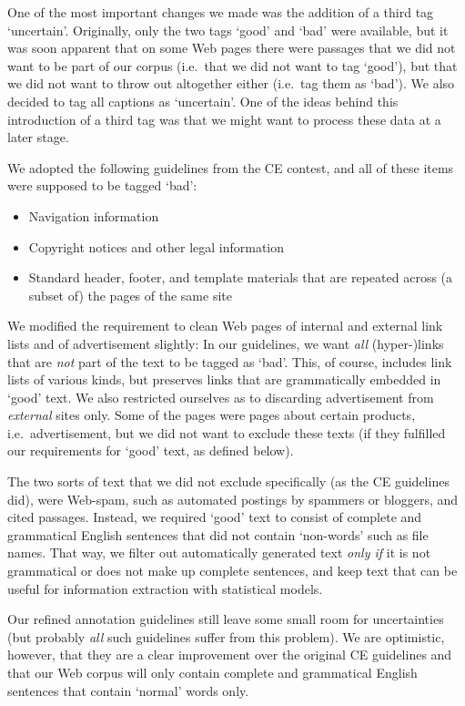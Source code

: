\documentclass[12pt,a4paper]{article}
\begin{document}
One of the most important changes we made was the addition of a third tag `uncertain'. 
Originally, only the two tags `good' and `bad' were available, but it was soon apparent that on some Web pages there were passages that we did not want to be part of our corpus (i.e.~that we did not want to tag `good'), but that we did not want to throw out altogether either (i.e.~tag them as `bad'). 
We also decided to tag all captions as `uncertain'. 
One of the ideas behind this introduction of a third tag was that we might want to process these data at a later stage.

We adopted the following guidelines from the CE contest, and all of these items were supposed to be tagged `bad':

\begin{itemize}
	\item Navigation information
	\item Copyright notices and other legal information
	\item Standard header, footer, and template materials that are repeated across (a subset of) the pages of the same site
\end{itemize}

We modified the requirement to clean Web pages of internal and external link lists and of advertisement slightly: 
In our guidelines, we want \textit{all} \mbox{(hyper-)links} that are \textit{not} part of the text to be tagged as `bad'. 
This, of course, includes link lists of various kinds, but preserves links that are grammatically embedded in `good' text. 
We also restricted ourselves as to discarding advertisement from \textit{external} sites only. 
Some of the pages were pages about certain products, i.e.~advertisement, but we did not want to exclude these texts (if they fulfilled our requirements for `good' text, as defined below).

The two sorts of text that we did not exclude specifically (as the CE guidelines did), were Web-spam, such as automated postings by spammers or bloggers, and cited passages. 
Instead, we required `good' text to consist of complete and grammatical English sentences that did not contain `non-words' such as file names. 
That way, we filter out automatically generated text \textit{only if} it is not grammatical or does not make up complete sentences, and keep text that can be useful for information extraction with statistical models.

Our refined annotation guidelines still leave some small room for uncertainties (but probably \textit{all} such guidelines suffer from this problem). 
We are optimistic, however, that they are a clear improvement over the original CE guidelines and that our Web corpus will only contain complete and grammatical English sentences that contain `normal' words only.
\end{document}
